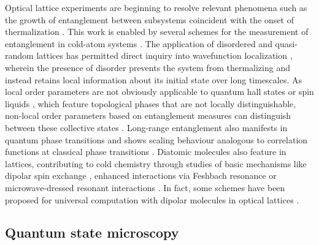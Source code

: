 	Optical lattice experiments are beginning to resolve relevant phenomena such as the growth of entanglement between subsystems coincident with the onset of thermalization \cite{Clos16,Kaufman16}.
	This work is enabled by several schemes for the measurement of entanglement in cold-atom systems \cite{Chiu18,Brydges19,Daley12,Mouraalves04}.
	The application of disordered and quasi-random lattices has permitted direct inquiry into wavefunction localization \cite{Anderson58,Dalessio16,Goold16,Srednicki94,Clos16,Kaufman16,Nandkishore15}, wherein the presence of disorder prevents the system from thermalizing and instead retains local information about its initial state over long timescales.
	As local order parameters are not obviously applicable to quantum hall states or spin liquids \cite{Isakov11}, which feature topological phases that are not locally distinguishable, non-local order parameters based on entanglement measures can distinguish between these collective states \cite{Isakov11,Jiang12}.
	Long-range entanglement also manifests in quantum phase transitions \cite{Osborne02} and shows scaling behaviour analogous to correlation functions at classical phase transitions \cite{Osterloh02}.
	Diatomic molecules also feature in lattices, contributing to cold chemistry \cite{Balakrishnan16} through studies of basic mechanisms like dipolar spin exchange \cite{Yan13}, enhanced interactions via Feshbach resonance \cite{Yang19} or microwave-dressed resonant interactions \cite{Yan20}.
	In fact, some schemes have been proposed for universal computation with dipolar molecules in optical lattices \cite{Yelin06, Micheli06}.
	
\subsection{Quantum state microscopy}

